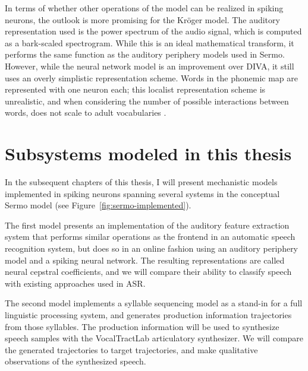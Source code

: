 In terms of whether other operations
of the model can be realized in spiking neurons,
the outlook is more promising
for the Kr\"{o}ger model.
The auditory representation used
is the power spectrum of the audio signal,
which is computed as a bark-scaled spectrogram.
While this is an ideal mathematical transform,
it performs the same function as the
auditory periphery models used in Sermo.
However, while the neural network model
is an improvement over DIVA,
it still uses an overly simplistic
representation scheme.
Words in the phonemic map
are represented with one neuron each;
this localist representation scheme is unrealistic,
and when considering the number of possible
interactions between words,
does not scale to adult vocabularies
\citep{crawford2014}.

\section{Subsystems modeled in this thesis}

In the subsequent chapters of this thesis,
I will present mechanistic models
implemented in spiking neurons
spanning several systems
in the conceptual Sermo model
(see Figure~\ref{fig:sermo-implemented}).


The first model presents an implementation
of the auditory feature extraction system
that performs similar operations as
the frontend in an automatic speech recognition system,
but does so in an online fashion
using an auditory periphery model
and a spiking neural network.
The resulting representations are called
neural cepstral coefficients,
and we will compare their ability
to classify speech with
existing approaches used in ASR.

The second model implements
a syllable sequencing model
as a stand-in for a
full linguistic processing system,
and generates production information trajectories
from those syllables.
The production information will be
used to synthesize speech samples
with the VocalTractLab articulatory synthesizer.
We will compare the generated trajectories
to target trajectories,
and make qualitative observations
of the synthesized speech.

